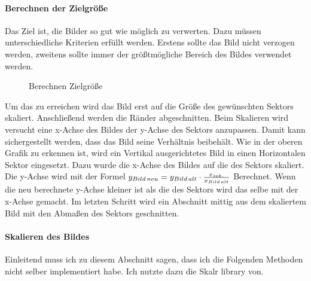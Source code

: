 \newpage

\paragraph{Berechnen der Zielgröße}
Das Ziel ist, die Bilder so gut wie möglich zu verwerten. Dazu müssen unterschiedliche Kriterien erfüllt werden. Erstens sollte das Bild nicht verzogen werden, zweitens sollte immer der größtmögliche Bereich des Bildes verwendet werden.

\begin{figure}[h]
    \centering
    \fontsize{12pt}{12pt}\selectfont%
    \def\svgwidth{12cm}
    
    \caption[Berechnen Zielgröße]{Berechnen Zielgröße}
\end{figure}

Um das zu erreichen wird das Bild erst auf die Größe des gewünschten Sektors skaliert. Anschließend werden die Ränder abgeschnitten. Beim Skalieren wird versucht eine x-Achse des Bildes der y-Achse des Sektors anzupassen. Damit kann sichergestellt werden, dass das Bild seine Verhältnis beibehält. Wie in der oberen Grafik zu erkennen ist, wird ein Vertikal ausgerichtetes Bild in einen Horizontalen Sektor eingesetzt. Dazu wurde die x-Achse des Bildes auf die des Sektors skaliert. Die y-Achse wird mit der Formel $y_\mathnormal{Bild\,neu}=y_\mathnormal{Bild\,alt} \cdot \frac{x_\mathnormal{sek.}}{x_\mathnormal{Bild\,alt}}$ Berechnet. Wenn die neu berechnete y-Achse kleiner ist als die des Sektors wird das selbe mit der x-Achse gemacht. Im letzten Schritt wird ein Abschnitt mittig aus dem skaliertem Bild mit den Abmaßen des Sektors geschnitten.

\paragraph{Skalieren des Bildes}
Einleitend muss ich zu diesem Abschnitt sagen, dass ich die Folgenden Methoden nicht selber implementiert habe. Ich nutzte dazu die Skalr library von.

\begin{center} %
    
\end{center}